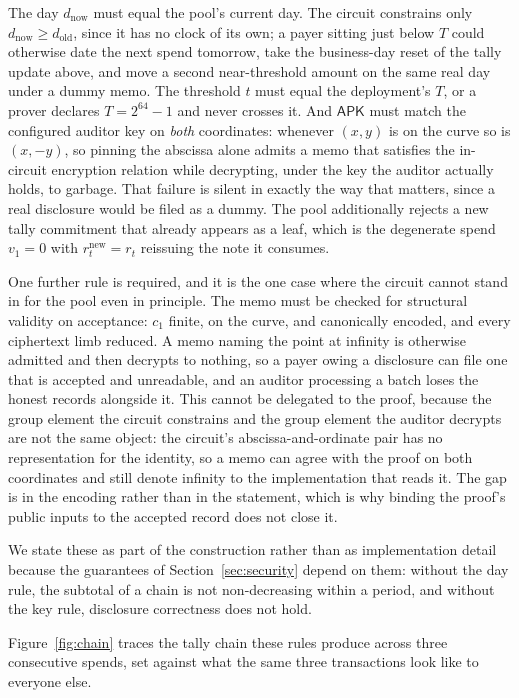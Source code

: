 \documentclass[11pt,a4paper]{article}
\theoremstyle{definition}
\theoremstyle{plain}
\theoremstyle{remark}
\begin{document}
The day $d_{\mathrm{now}}$ must equal the pool's current day. The circuit constrains only $d_{\mathrm{now}} \geq d_{\mathrm{old}}$, since it has no clock of its own; a payer sitting just below $T$ could otherwise date the next spend tomorrow, take the business-day reset of the tally update above, and move a second near-threshold amount on the same real day under a dummy memo. The threshold $t$ must equal the deployment's $T$, or a prover declares $T = 2^{64}-1$ and never crosses it. And $\mathsf{APK}$ must match the configured auditor key on \emph{both} coordinates: whenever $(x,y)$ is on the curve so is $(x,-y)$, so pinning the abscissa alone admits a memo that satisfies the in-circuit encryption relation while decrypting, under the key the auditor actually holds, to garbage. That failure is silent in exactly the way that matters, since a real disclosure would be filed as a dummy. The pool additionally rejects a new tally commitment that already appears as a leaf, which is the degenerate spend $v_1 = 0$ with $r_t^{\mathrm{new}} = r_t$ reissuing the note it consumes.

One further rule is required, and it is the one case where the circuit cannot stand in for the pool even in principle. The memo must be checked for structural validity on acceptance: $c_1$ finite, on the curve, and canonically encoded, and every ciphertext limb reduced. A memo naming the point at infinity is otherwise admitted and then decrypts to nothing, so a payer owing a disclosure can file one that is accepted and unreadable, and an auditor processing a batch loses the honest records alongside it. This cannot be delegated to the proof, because the group element the circuit constrains and the group element the auditor decrypts are not the same object: the circuit's abscissa-and-ordinate pair has no representation for the identity, so a memo can agree with the proof on both coordinates and still denote infinity to the implementation that reads it. The gap is in the encoding rather than in the statement, which is why binding the proof's public inputs to the accepted record does not close it.

We state these as part of the construction rather than as implementation detail because the guarantees of Section~\ref{sec:security} depend on them: without the day rule, the subtotal of a chain is not non-decreasing within a period, and without the key rule, disclosure correctness does not hold.

Figure~\ref{fig:chain} traces the tally chain these rules produce across three consecutive spends, set against what the same three transactions look like to everyone else.
\end{document}
